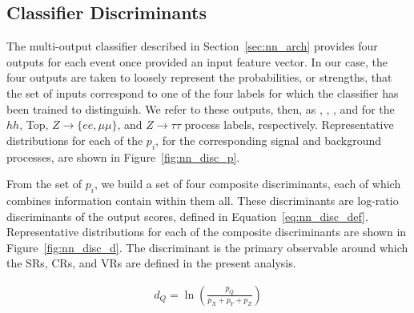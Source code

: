 %
%

\subsection{Classifier Discriminants}
\label{sec:nn_discriminants}

The multi-output classifier described in Section~\ref{sec:nn_arch} provides four outputs for each event
once provided an input feature vector.
In our case, the four outputs are taken to loosely represent the probabilities, or strengths, that the
set of inputs correspond to one of the four labels for which the classifier has been trained to distinguish.
We refer to these outputs, then, as \phh, \ptop, \pzsf, and \pztt
for the $hh$, Top, $Z\rightarrow \{ee,\mu\mu\}$, and $Z\rightarrow \tau\tau$ process labels, respectively.
Representative distributions for each of the $p_i$, for the corresponding signal and background processes,
are shown in Figure~\ref{fig:nn_disc_p}.

From the set of $p_i$, we build a set of four composite discriminants, each of which combines information
contain within them all.
These discriminants are log-ratio discriminants of the output scores, defined in Equation~\ref{eq:nn_disc_def}.
Representative distributions for each of the composite discriminants are shown in Figure~\ref{fig:nn_disc_d}.
The discriminant \dhh is the primary observable around which the SRs, CRs, and VRs are defined
in the present analysis.

\begin{align}
    d_Q = \ln \left( \frac{p_Q}{p_X + p_Y + p_Z} \right)
    \label{eq:nn_disc_def}
\end{align}

